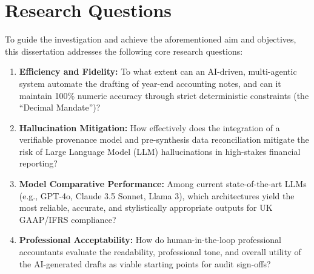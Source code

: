\section{Research Questions}
To guide the investigation and achieve the aforementioned aim and objectives, this dissertation addresses the following core research questions:
\begin{enumerate}[label=\textbf{RQ\arabic*:}]
    \item \textbf{Efficiency and Fidelity:} To what extent can an AI-driven, multi-agentic system automate the drafting of year-end accounting notes, and can it maintain 100\% numeric accuracy through strict deterministic constraints (the ``Decimal Mandate'')?
    \item \textbf{Hallucination Mitigation:} How effectively does the integration of a verifiable provenance model and pre-synthesis data reconciliation mitigate the risk of Large Language Model (LLM) hallucinations in high-stakes financial reporting?
    \item \textbf{Model Comparative Performance:} Among current state-of-the-art LLMs (e.g., GPT-4o, Claude 3.5 Sonnet, Llama 3), which architectures yield the most reliable, accurate, and stylistically appropriate outputs for UK GAAP/IFRS compliance?
    \item \textbf{Professional Acceptability:} How do human-in-the-loop professional accountants evaluate the readability, professional tone, and overall utility of the AI-generated drafts as viable starting points for audit sign-offs?
\end{enumerate}
